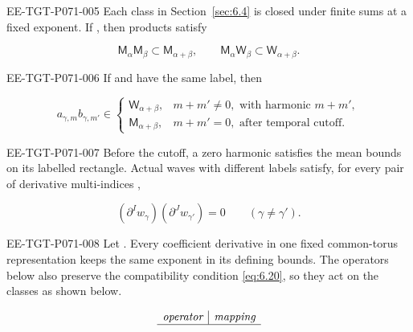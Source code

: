 \begin{proposition}\label{prop:6.6}
\begin{EESegment}{EE-TGT-P071-005}
Each class in Section~\ref{sec:6.4} is closed under finite sums at a fixed exponent. If , then products satisfy
\end{EESegment}
\begin{equation}
  \mathsf M_\alpha\mathsf M_\beta\subset\mathsf M_{\alpha+\beta},
  \qquad
  \mathsf M_\alpha\mathsf W_\beta\subset\mathsf W_{\alpha+\beta}.
  \tag{6.30}\label{eq:6.30}
\end{equation}
\begin{EESegment}{EE-TGT-P071-006}
If  and  have the same label, then
\end{EESegment}
\begin{equation}
  a_{\gamma,m}b_{\gamma,m'}\in
  \begin{cases}
    \mathsf W_{\alpha+\beta},&m+m'\ne0,
      \text{ with harmonic }m+m',\\
    \mathsf M_{\alpha+\beta},&m+m'=0,
      \text{ after temporal cutoff}.
  \end{cases}
  \tag{6.31}\label{eq:6.31}
\end{equation}
\begin{EESegment}{EE-TGT-P071-007}
Before the cutoff, a zero harmonic satisfies the mean bounds on its labelled rectangle. Actual waves with different labels satisfy, for every pair of derivative multi-indices ,
\end{EESegment}
\[
  (\partial^Iw_\gamma)(\partial^Jw_{\gamma'})=0
  \qquad(\gamma\ne\gamma').
\]
\begin{EESegment}{EE-TGT-P071-008}
Let . Every coefficient derivative in one fixed common-torus representation keeps the same  exponent in its defining bounds. The operators below also preserve the compatibility condition \eqref{eq:6.20}, so they act on the classes as shown below.
\end{EESegment}
\begin{equation}
  \begin{array}{c|c}
    \textit{operator}&\textit{mapping}\\ \hline

\end{array}
\end{equation}
\end{proposition}
